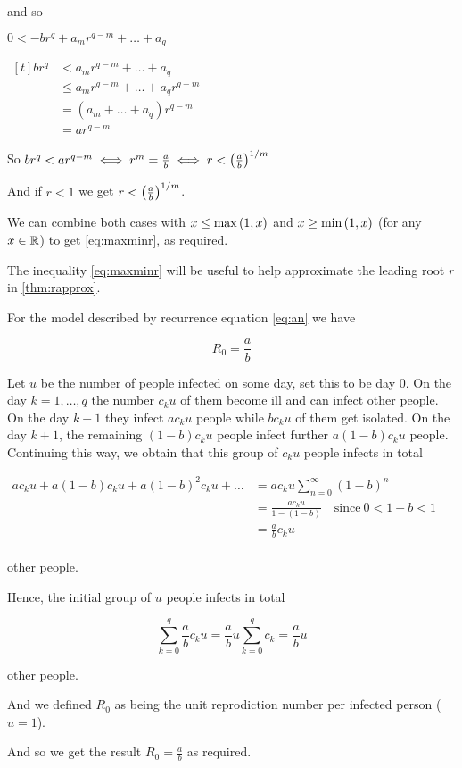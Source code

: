 \begin{theorem}
\begin{pf}
\begin{enumerate}[(a)]
    and so 
    
    $0<-br^q + a_mr^{q-m} +  \dots + a_q$
    
    \imp $\begin{aligned}[t]
    br^q 
    &<    a_mr^{q-m} +  \dots + a_q\\
    &\leq a_mr^{q-m} +  \dots + a_qr^{q-m} \\
    &= (a_m + \dots + a_q)r^{q-m} \\
    &= ar^{q-m} 
    \end{aligned}$
    
    So $br^q < ar^{q-m} \iff r^m=\frac{a}{b} \iff r<\left(\frac{a}{b}\right)^{1/m}$
    
    And if $r<1$ we get $r<\left(\frac{a}{b}\right)^{1/m}$.
    
    We can combine both cases with $x\leq \max\left(1,x\right)$ and $x\geq \min\left(1,x\right)$ (for any $x\in \mathbb R$) to get \eqref{eq:maxminr}, as required.
\end{enumerate}
\end{pf}
\end{theorem}

\begin{nremark}
The inequality \eqref{eq:maxminr} will be useful to help approximate the leading root $r$ in \ref{thm:rapprox}.
\end{nremark}

\begin{lemma}
For the model described by recurrence equation \eqref{eq:an} we have

$$R_0=\frac{a}{b}$$

\begin{pf}
Let $u$ be the number of people infected on some day, set this to be day $0$. On the day $k = 1, \dots , q$ the number $c_ku$ of them become ill and can infect other people. On the day $k + 1$ they infect $ac_ku$ people while $bc_ku$ of them get isolated. On the day $k + 1$, the remaining $(1 - b) c_ku$ people infect further $a (1 - b) c_ku$ people. Continuing this way, we obtain that this group of $c_ku$ people infects in total

$\begin{aligned}
ac_ku+a(1-b)c_ku+a(1-b)^2c_ku+\dots 
&= ac_ku\sum\limits_{n=0}^\infty (1-b)^n \\
&= \frac{ac_ku}{1-(1-b)} \quad \text{since} \ 0<1-b<1\\
&=\frac{a}{b}c_ku\\
\end{aligned}$ 

other people.

Hence, the initial group of $u$ people infects in total 

$$\sum\limits_{k=0}^q \frac{a}{b}c_ku 
= \frac{a}{b}u\sum\limits_{k=0}^q c_k
= \frac{a}{b}u$$

other people.

And we defined $R_0$ as being the unit reprodiction number per infected person ($u=1$).

And so we get the result $R_0=\frac{a}{b}$ as required.
\end{pf}
\end{lemma}



